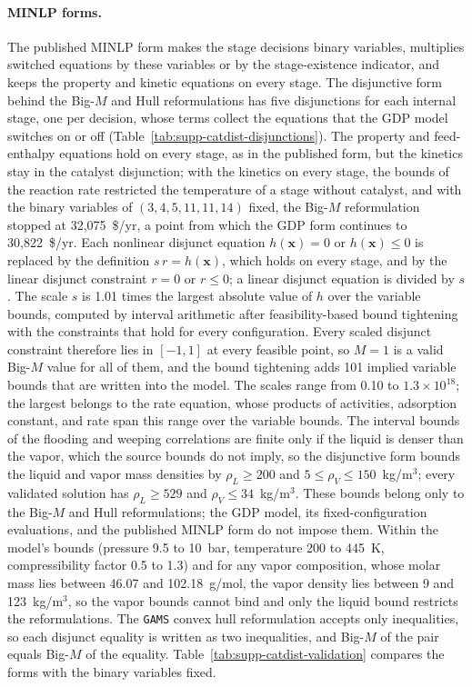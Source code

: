 \paragraph{MINLP forms.}
The published MINLP form makes the stage decisions binary variables, multiplies switched equations by these variables or by the stage-existence indicator, and keeps the property and kinetic equations on every stage.
The disjunctive form behind the Big-\(M\) and Hull reformulations has five disjunctions for each internal stage, one per decision, whose terms collect the equations that the GDP model switches on or off (Table~\ref{tab:supp-catdist-disjunctions}).
The property and feed-enthalpy equations hold on every stage, as in the published form, but the kinetics stay in the catalyst disjunction; with the kinetics on every stage, the bounds of the reaction rate restricted the temperature of a stage without catalyst, and with the binary variables of \((3,4,5,11,11,14)\) fixed, the Big-\(M\) reformulation stopped at 32,075~\$/yr, a point from which the GDP form continues to 30,822~\$/yr.
Each nonlinear disjunct equation \(h(\mathbf x)=0\) or \(h(\mathbf x)\le 0\) is replaced by the definition \(s\,r=h(\mathbf x)\), which holds on every stage, and by the linear disjunct constraint \(r=0\) or \(r\le 0\); a linear disjunct equation is divided by \(s\).
The scale \(s\) is 1.01 times the largest absolute value of \(h\) over the variable bounds, computed by interval arithmetic after feasibility-based bound tightening with the constraints that hold for every configuration.
Every scaled disjunct constraint therefore lies in \([-1,1]\) at every feasible point, so \(M=1\) is a valid Big-\(M\) value for all of them, and the bound tightening adds 101 implied variable bounds that are written into the model.
The scales range from 0.10 to \(1.3\times10^{18}\); the largest belongs to the rate equation, whose products of activities, adsorption constant, and rate span this range over the variable bounds.
The interval bounds of the flooding and weeping correlations are finite only if the liquid is denser than the vapor, which the source bounds do not imply, so the disjunctive form bounds the liquid and vapor mass densities by \(\rho_L\ge200\) and \(5\le\rho_V\le150\)~kg/m\(^3\); every validated solution has \(\rho_L\ge529\) and \(\rho_V\le34\)~kg/m\(^3\).
These bounds belong only to the Big-\(M\) and Hull reformulations; the GDP model, its fixed-configuration evaluations, and the published MINLP form do not impose them.
Within the model's bounds (pressure 9.5 to 10~bar, temperature 200 to 445~K, compressibility factor 0.5 to 1.3) and for any vapor composition, whose molar mass lies between 46.07 and 102.18~g/mol, the vapor density lies between 9 and 123~kg/m\(^3\), so the vapor bounds cannot bind and only the liquid bound restricts the reformulations.
The \texttt{GAMS} convex hull reformulation accepts only inequalities, so each disjunct equality is written as two inequalities, and Big-\(M\) of the pair equals Big-\(M\) of the equality.
Table~\ref{tab:supp-catdist-validation} compares the forms with the binary variables fixed.

